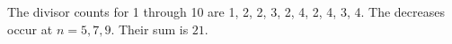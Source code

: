 The divisor counts for 1 through 10 are 1, 2, 2, 3, 2, 4, 2, 4, 3, 4. The decreases occur at $n=5,7,9$. Their sum is $\boxed{21}$.
